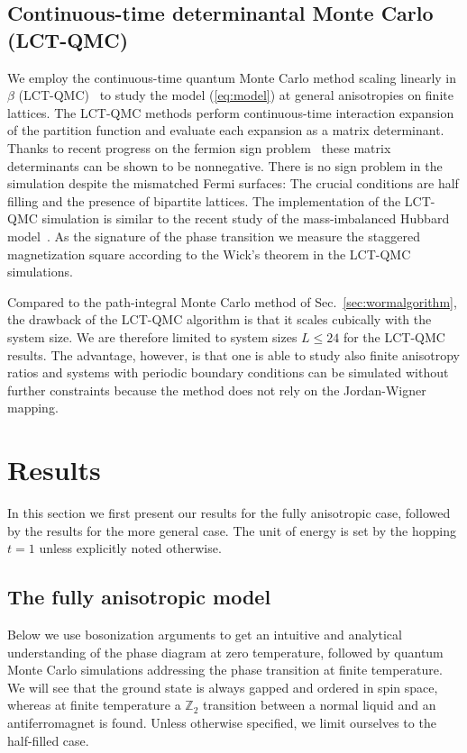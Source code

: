 \documentclass[twocolumn,superscriptaddress,pra,showpacs,longbibliography]{revtex4-1}
\newcommand{\<}{\langle}
\renewcommand{\>}{\rangle}
\begin{document}
\subsection{Continuous-time determinantal Monte Carlo (LCT-QMC)}

We employ the continuous-time quantum Monte Carlo method  scaling linearly in $\beta$ (LCT-QMC)~\cite{Iazzi:2015hi, 2015PhRvB..91w5151W} to study the model (\ref{eq:model}) at general anisotropies on finite lattices. The LCT-QMC methods perform continuous-time interaction expansion of the partition function and evaluate each expansion as a matrix determinant.  Thanks to recent progress on the fermion sign problem~\cite{Huffman:2014fj, Li:2015jf, Wang:2015hm, PhysRevLett.116.250601} these matrix determinants can be shown to be nonnegative. There is no sign problem in the simulation despite the mismatched Fermi surfaces: The crucial conditions are half filling and the presence of bipartite lattices. The implementation of the LCT-QMC simulation is similar to the recent study of the mass-imbalanced Hubbard model~\cite{Liu:2015kx}. As the signature of the phase transition we measure the staggered magnetization square according to the Wick's theorem in the LCT-QMC simulations.  

Compared to the path-integral Monte Carlo method of Sec.~\ref{sec:wormalgorithm}, the drawback of the  LCT-QMC algorithm is that it scales cubically with the system size. We are therefore limited to system sizes $L\le 24$ for the LCT-QMC results. The advantage, however, is that one is able to study also finite anisotropy ratios and systems with periodic boundary conditions can be simulated without further constraints because the method does not rely on the Jordan-Wigner mapping.


\section{Results\label{sec:results}}

In this section we first present our results for the fully anisotropic case, followed by the results for the more general case.
The unit of energy is set by the hopping $t=1$ unless explicitly noted otherwise.

\subsection{The fully anisotropic model \label{sec:fullyanisotropic}}

Below we use bosonization arguments to get an intuitive and analytical understanding of  the phase diagram at zero temperature, followed by quantum Monte Carlo simulations addressing the phase transition at finite temperature. We will see that the ground state is always gapped and ordered in spin space, whereas at finite temperature a  $\mathbb{Z}_{2}$ transition between a normal liquid and an antiferromagnet is found. Unless otherwise specified, we limit ourselves to the half-filled case.
\end{document}
